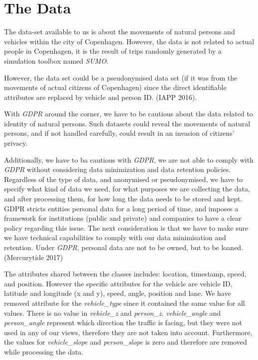 \documentclass[format=acmsmall, review=false, screen=true]{acmart}
\begin{document}
\section{The Data}
The data-set available to us is about the movements of natural persons and vehicles within the city of Copenhagen. However, the data is not related to actual people in Copenhagen, it is the result of trips randomly generated by a simulation toolbox named \textit{SUMO}.

However, the data set could be a pseudonymised data set (if it was from the movements of actual citizens of Copenhagen) since the direct identifiable attributes are replaced by vehicle and person ID.  (IAPP 2016).

With \textit{GDPR} around the corner, we have to be cautious about the data related to identity of natural persons. Such datasets could reveal the movements of natural persons, and if not handled carefully, could result in an invasion of citizens’ privacy.

Additionally, we have to ba cautious with \textit{GDPR}, we are not able to comply with \textit{GDPR} without considering data minimization and data retention policies. Regardless of the type of data, and anonymised or pseudonymised, we have to specify what kind of data we need, for what purposes we are collecting the data, and after processing them, for how long the data needs to be stored and kept. GDPR stricts entities personal data for a long period of time, and imposes a framework for institutions (public and private) and companies to have a clear policy regarding this issue. The next consideration is that we have to make sure we have technical capabilities to comply with our data minimisation and retention. Under \textit{GDPR}, personal data are not to be owned, but to be loaned. (Mercurytide 2017)

The attributes shared between the classes includes: location, timestamp, speed, and position. However the specific attributes for the vehicle are vehicle ID, latitude and longitude (x and y), speed, angle, position and lane. We have removed attribute for the \textit{vehicle\_type} since it contained the same value for all values. There is no value in \textit{vehicle\_z} and \textit{person\_z}. \textit{vehicle\_angle} and \textit{person\_angle} represent which direction the traffic is facing, but they were not used in any of our views, therefore they are not taken into account. Furthermore, the values for \textit{vehicle\_slope} and \textit{person\_slope} is zero and therefore are removed while processing the data.
\end{document}
